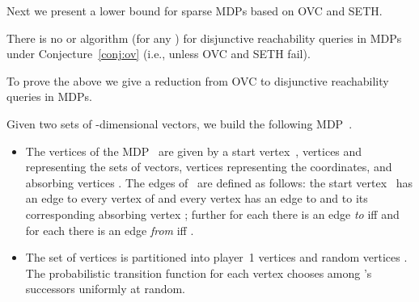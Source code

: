 \documentclass[11pt,letterpaper]{article}
\newcommand{\lu}{\textup{(}}
\newcommand{\ru}{\textup{)}\xspace}
\newcommand{\upbr}[1]{\lu #1\ru}
\newif\iffullversion
\newcommand{\infull}[1]{\iffullversion #1\fi}
\begin{document}
Next we present a lower bound for sparse MDPs based on OVC and SETH.

\begin{theorem}\label{thm:reach_OVChard}
  There is no  or  algorithm
  \upbr{for any } for 
  disjunctive reachability queries in MDPs under Conjecture~\ref{conj:ov} \upbr{i.e., unless OVC and SETH fail}.
  \infull{In particular, there is no such algorithm deciding whether the winning set is non-empty
  or deciding whether a specific vertex is in the winning set.}
\end{theorem}

To prove the above we give a reduction from OVC to disjunctive reachability queries
in MDPs.

\begin{reduction}\label{red:OVtoMDPReach}
 Given two sets  of -dimensional vectors, we build the following MDP~.  
 \begin{itemize}
  \item The vertices  of the MDP~
  are given by a start vertex~, vertices  and  representing the 
  sets of vectors, vertices  representing the 
  coordinates, and absorbing vertices .
  The edges  of~ are defined as follows: the start vertex~
  has an edge to every vertex of  and every vertex  has an edge to 
  and to its corresponding absorbing vertex ; further for each 
  there is an edge \emph{to}  iff  and for each 
  there is an edge \emph{from}  iff .
	  
  \item The set of vertices  is partitioned into player~1 vertices 
	and random vertices .
	The probabilistic transition function for each vertex  chooses among 's successors
	uniformly at random.
 \end{itemize}
\end{reduction}
\end{document}

